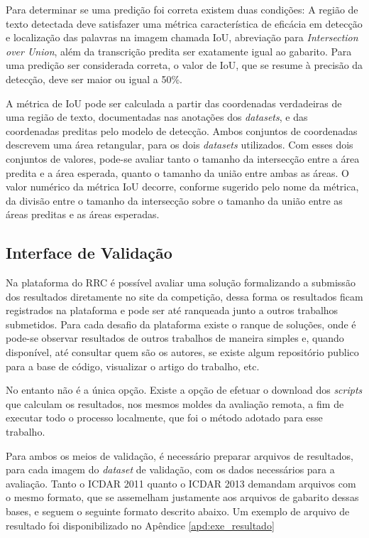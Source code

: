 Para determinar se uma predição foi correta existem duas condições: A região de texto detectada deve satisfazer uma métrica característica de eficácia em detecção e localização das palavras na imagem chamada IoU, abreviação para \textit{Intersection over Union}, além da transcrição predita ser exatamente igual ao gabarito. Para uma predição ser considerada correta, o valor de IoU, que se resume à precisão da detecção, deve ser maior ou igual a 50\%.

A métrica de IoU pode ser calculada a partir das coordenadas verdadeiras de uma região de texto, documentadas nas anotações dos \textit{datasets}, e das coordenadas preditas pelo modelo de detecção. Ambos conjuntos de coordenadas descrevem uma área retangular, para os dois \textit{datasets} utilizados. Com esses dois conjuntos de valores, pode-se avaliar tanto o tamanho da intersecção entre a área predita e a área esperada, quanto o tamanho da união entre ambas as áreas. O valor numérico da métrica IoU decorre, conforme sugerido pelo nome da métrica, da divisão entre o tamanho da intersecção sobre o tamanho da união entre as áreas preditas e as áreas esperadas.

\subsection{Interface de Validação}\label{sec:methodology_validation_interface}
Na plataforma do RRC é possível avaliar uma solução formalizando a submissão dos resultados diretamente no site da competição, dessa forma os resultados ficam registrados na plataforma e pode ser até ranqueada junto a outros trabalhos submetidos. Para cada desafio da plataforma existe o ranque de soluções, onde é pode-se observar resultados de outros trabalhos de maneira simples e, quando disponível, até consultar quem são os autores, se existe algum repositório publico para a base de código, visualizar o artigo do trabalho, etc.

No entanto não é a única opção. Existe a opção de efetuar o download dos \textit{scripts} que calculam os resultados, nos mesmos moldes da avaliação remota, a fim de executar todo o processo localmente, que foi o método adotado para esse trabalho.

Para ambos os meios de validação, é necessário preparar arquivos de resultados, para cada imagem do \textit{dataset} de validação, com os dados necessários para a avaliação. Tanto o ICDAR 2011 quanto o ICDAR 2013 demandam arquivos com o mesmo formato, que se assemelham justamente aos arquivos de gabarito dessas bases, e seguem o seguinte formato descrito abaixo. Um exemplo de arquivo de resultado foi disponibilizado no Apêndice \ref{apd:exe_resultado}

